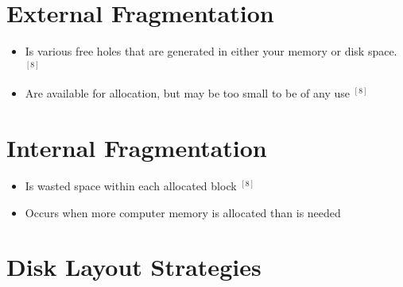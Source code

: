 \documentclass[12pt]{article}
\begin{document}
\section{External Fragmentation}

\begin{itemize}
    \item Is various free holes that are generated in either your
    memory or disk space. $^{[8]}$
    \item Are available for allocation, but may be too small to be of
    any use $^{[8]}$
\end{itemize}

\section{Internal Fragmentation}

\begin{itemize}
    \item Is wasted space within each allocated block $^{[8]}$
    \item Occurs when more computer memory is allocated than is needed
\end{itemize}




\section{Disk Layout Strategies}
\end{document}
